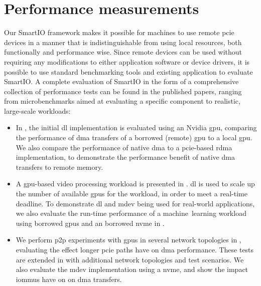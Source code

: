 \section{Performance measurements}\label{sec:eval}
Our SmartIO framework makes it possible for machines to use remote \gls{pcie} devices in a manner that is indistinguishable from using local resources, both functionally and performance wise.
%
Since remote devices can be used without requiring any modifications to either application software or device drivers, it is possible to use standard benchmarking tools and existing application to evaluate SmartIO.
%
A complete evaluation of SmartIO in the form of a comprehensive collection of performance tests can be found in the published papers, ranging from microbenchmarks aimed at evaluating a specific component to realistic, large-scale workloads:
%
\begin{itemize}

    \item In , the initial \gls{dl} implementation is evaluated using an Nvidia \gls{gpu}, comparing the performance of \gls{dma} transfers of a borrowed (remote) \gls{gpu} to a local \gls{gpu}.
        We also compare the performance of native \gls{dma} to a \gls{pcie}-based \gls{rdma} implementation, to demonstrate the performance benefit of native \gls{dma} transfers to remote memory.

    \item A \gls{gpu}-based video processing workload is presented in . \Gls{dl} is used to scale up the number of available \glspl{gpu} for the workload, in order to meet a real-time deadline.
        To demonstrate \gls{dl} and \gls{mdev} being used for real-world applications, we also evaluate the run-time performance of a machine~learning workload using borrowed \glspl{gpu} and an borrowed \gls{nvme} in .

    \item We perform \gls{p2p} experiments with \glspl{gpu} in several network topologies in , evaluating the effect longer \gls{pcie} paths have on \gls{dma} performance. These tests are extended in  with additional network topologies and test scenarios.
        We also evaluate the \gls{mdev} implementation using a  \gls{nvme}, and show the impact \glspl{iommu} have on on \gls{dma} transfers. 


\end{itemize}
